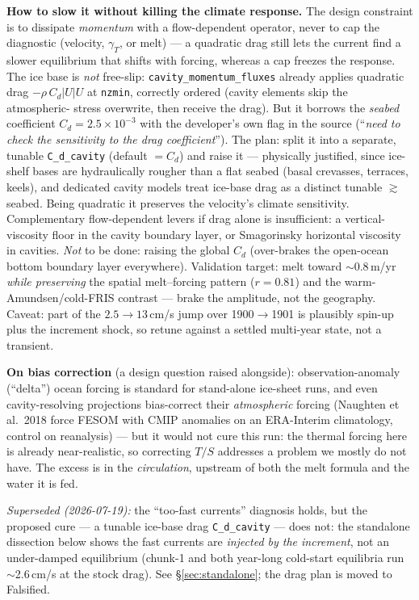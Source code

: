 \documentclass[11pt,a4paper]{article}
\newcommand{\code}[1]{\texttt{\small #1}}
\begin{document}
\textbf{How to slow it without killing the climate response.} The design constraint is to
dissipate \emph{momentum} with a flow-dependent operator, never to cap the diagnostic
(velocity, $\gamma_T$, or melt) --- a quadratic drag still lets the current find a slower
equilibrium that shifts with forcing, whereas a cap freezes the response. The ice base is
\emph{not} free-slip: \code{cavity\_momentum\_fluxes} already applies quadratic drag
$-\rho\,C_d|U|U$ at \code{nzmin}, correctly ordered (cavity elements skip the atmospheric-
stress overwrite, then receive the drag). But it borrows the \emph{seabed} coefficient
$C_d=2.5\times10^{-3}$ with the developer's own flag in the source (``\emph{need to check the
sensitivity to the drag coefficient}''). The plan: split it into a separate, tunable
\code{C\_d\_cavity} (default $=C_d$) and raise it --- physically justified, since ice-shelf
bases are hydraulically rougher than a flat seabed (basal crevasses, terraces, keels), and
dedicated cavity models treat ice-base drag as a distinct tunable $\gtrsim$ seabed. Being
quadratic it preserves the velocity's climate sensitivity. Complementary flow-dependent
levers if drag alone is insufficient: a vertical-viscosity floor in the cavity boundary
layer, or Smagorinsky horizontal viscosity in cavities. \emph{Not} to be done: raising the
global $C_d$ (over-brakes the open-ocean bottom boundary layer everywhere). Validation
target: melt toward $\sim$0.8\,m/yr \emph{while preserving} the spatial melt--forcing pattern
($r=0.81$) and the warm-Amundsen/cold-FRIS contrast --- brake the amplitude, not the
geography. Caveat: part of the $2.5\to13$\,cm/s jump over 1900$\to$1901 is plausibly spin-up
plus the increment shock, so retune against a settled multi-year state, not a transient.

\textbf{On bias correction} (a design question raised alongside): observation-anomaly
(``delta'') ocean forcing is standard for stand-alone ice-sheet runs, and even
cavity-resolving projections bias-correct their \emph{atmospheric} forcing (Naughten et
al.\ 2018 force FESOM with CMIP anomalies on an ERA-Interim climatology, control on
reanalysis) --- but it would not cure this run: the thermal forcing here is already
near-realistic, so correcting $T/S$ addresses a problem we mostly do not have. The excess is
in the \emph{circulation}, upstream of both the melt formula and the water it is fed.

\emph{Superseded (2026-07-19):} the ``too-fast currents'' diagnosis holds, but the proposed
cure --- a tunable ice-base drag \code{C\_d\_cavity} --- does not: the standalone dissection
below shows the fast currents are \emph{injected by the increment}, not an under-damped
equilibrium (chunk-1 and both year-long cold-start equilibria run $\sim$2.6\,cm/s at the
stock drag). See \S\ref{sec:standalone}; the drag plan is moved to Falsified.
\end{document}
